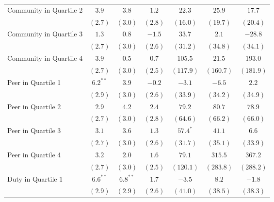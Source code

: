 \documentclass[12pt]{article}
\begin{document}
\begin{center}
\begin{longtable}{l c c c c c c }
Community in Quartile 2    & $3.9$         & $3.8$         & $1.2$        & $22.3$        & $25.9$         & $17.7$         \\
                           & $(2.7)$       & $(3.0)$       & $(2.8)$      & $(16.0)$      & $(19.7)$       & $(20.4)$       \\
Community in Quartile 3    & $1.3$         & $0.8$         & $-1.5$       & $33.7$        & $2.1$          & $-28.8$        \\
                           & $(2.7)$       & $(3.0)$       & $(2.6)$      & $(31.2)$      & $(34.8)$       & $(34.1)$       \\
Community in Quartile 4    & $3.9$         & $0.5$         & $0.7$        & $105.5$       & $21.5$         & $193.0$        \\
                           & $(2.7)$       & $(3.0)$       & $(2.5)$      & $(117.9)$     & $(160.7)$      & $(181.9)$      \\
Peer in Quartile 1         & $6.2^{**}$    & $3.9$         & $-0.2$       & $-3.1$        & $-6.5$         & $2.2$          \\
                           & $(2.9)$       & $(3.0)$       & $(2.6)$      & $(33.9)$      & $(34.2)$       & $(34.9)$       \\
Peer in Quartile 2         & $2.9$         & $4.2$         & $2.4$        & $79.2$        & $80.7$         & $78.9$         \\
                           & $(2.7)$       & $(3.0)$       & $(2.8)$      & $(64.6)$      & $(66.2)$       & $(66.0)$       \\
Peer in Quartile 3         & $3.1$         & $3.6$         & $1.3$        & $57.4^{*}$    & $41.1$         & $6.6$          \\
                           & $(2.7)$       & $(3.0)$       & $(2.6)$      & $(31.7)$      & $(35.1)$       & $(33.9)$       \\
Peer in Quartile 4         & $3.2$         & $2.0$         & $1.6$        & $79.1$        & $315.5$        & $367.2$        \\
                           & $(2.7)$       & $(3.0)$       & $(2.5)$      & $(120.1)$     & $(283.8)$      & $(288.2)$      \\
Duty in Quartile 1         & $6.6^{**}$    & $6.8^{**}$    & $1.7$        & $-3.5$        & $8.2$          & $-1.8$         \\
                           & $(2.9)$       & $(2.9)$       & $(2.6)$      & $(41.0)$      & $(38.5)$       & $(38.3)$       \\

\end{longtable}
\end{center}
\end{document}

